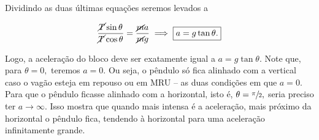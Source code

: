 \begin{exemplo}[Nível II]
Dividindo as duas últimas equações seremos levados a

$$ \dfrac{\cancel T \sin \theta }{\cancel T \cos \theta } = \dfrac{\cancel ma}{\cancel mg} \implies \boxed{a = g \tan \theta.}$$

Logo, a aceleração do bloco deve ser exatamente igual a $a = g \tan \theta.$ Note que, para $\theta = 0,$ teremos $a=0.$ Ou seja, o pêndulo só fica alinhado com a vertical caso o vagão esteja em repouso ou em MRU -- as duas condições em que $a=0.$ Para que o pêndulo ficasse alinhado com a horizontal, isto é, $\theta = \sfrac{\pi}{2},$ seria preciso ter $a \to \infty.$ Isso mostra que quando mais intensa é a aceleração, mais próximo da horizontal o pêndulo fica, tendendo à horizontal para uma aceleração infinitamente grande. 

\end{exemplo}

\vspace{0.3cm}


